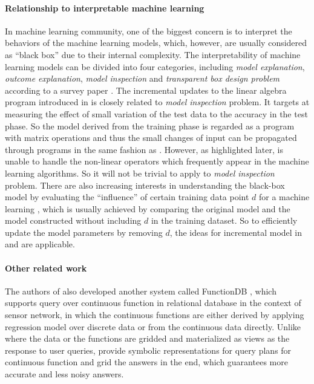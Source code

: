 \paragraph{Relationship to interpretable machine learning} In machine learning community, one of the biggest concern is to interpret the behaviors of the machine learning models, which, however, are usually considered as ``black box'' due to their internal complexity. The interpretability of machine learning models can be divided into four categories, including {\em model explanation}, {\em outcome explanation}, {\em model inspection} and {\em transparent box design problem} according to a survey paper \cite{guidotti2018survey}. The incremental updates to the linear algebra program introduced in \cite{nikolic2014linview} is closely related to {\em model inspection} problem. It targets at measuring the effect of small variation of the test data to the accuracy in the test phase. So the model derived from the training phase is regarded as a program with matrix operations and thus the small changes of input can be propagated through programs in the same fashion as \cite{nikolic2014linview}. However, as highlighted later, \cite{nikolic2014linview} is unable to handle the non-linear operators which frequently appear in the machine learning algorithms. So it will not be trivial to apply \cite{nikolic2014linview} to {\em model inspection} problem. There are also increasing interests in understanding the black-box model by evaluating the ``influence'' of certain training data point $d$ for a machine learning \cite{koh2017understanding}, which is usually achieved by comparing the original model and the model constructed without including $d$ in the training dataset. So to efficiently update the model parameters by removing $d$, the ideas for incremental model in \cite{gupta2015processing} and \cite{deshpande2006mauvedb} are applicable.

\paragraph{Other related work} The authors of \cite{deshpande2006mauvedb} also developed another system called FunctionDB \cite{thiagarajan2008querying}, which supports query over continuous function in relational database in the context of sensor network, in which the continuous functions are either derived by applying regression model over discrete data or from the continuous data directly. Unlike \cite{deshpande2006mauvedb} where the data or the functions are gridded and materialized as views as the response to user queries, \cite{thiagarajan2008querying} provide symbolic representations for query plans for continuous function and grid the answers in the end, which guarantees more accurate and less noisy answers.

